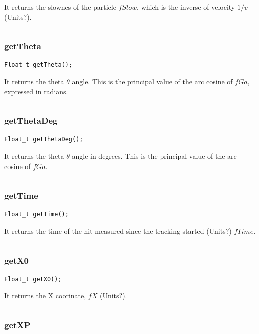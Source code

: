 \documentclass[a4paper]{book}
\begin{document}
It returns the slownes of the particle $fSlow$, which is the inverse of velocity $1/v$ (Units?).

\[\]

\subsubsection{getTheta}

\begin{lstlisting}
Float_t getTheta();
\end{lstlisting}

It returns the theta $\theta$ angle. This is the principal value of the arc cosine of $fGa$, expressed in radians.

\[\]

\subsubsection{getThetaDeg}

\begin{lstlisting}
Float_t getThetaDeg();
\end{lstlisting}

It returns the theta $\theta$ angle in degrees. This is the principal value of the arc cosine of $fGa$.

\[\]

\subsubsection{getTime}

\begin{lstlisting}
Float_t getTime();
\end{lstlisting}

It returns the time of the hit measured since the tracking started (Units?) $fTime$.

\[\]


\subsubsection{getX0}

\begin{lstlisting}
Float_t getX0();
\end{lstlisting}

It returns the X coorinate, $fX$ (Units?).

\[\]

\subsubsection{getXP}
\end{document}
